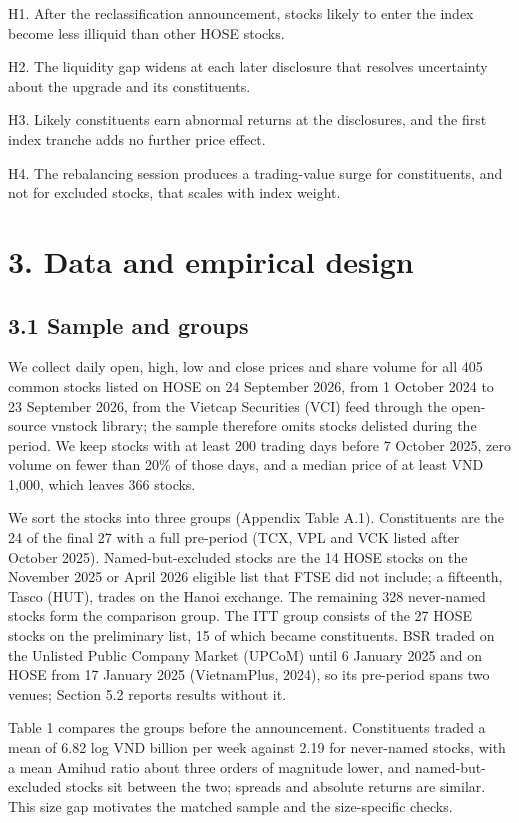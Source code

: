\documentclass[review,authoryear,12pt]{elsarticle}
\begin{document}
H1. After the reclassification announcement, stocks likely to enter the
index become less illiquid than other HOSE stocks.

H2. The liquidity gap widens at each later disclosure that resolves
uncertainty about the upgrade and its constituents.

H3. Likely constituents earn abnormal returns at the disclosures, and
the first index tranche adds no further price effect.

H4. The rebalancing session produces a trading-value surge for
constituents, and not for excluded stocks, that scales with index
weight.

\hypertarget{data-and-empirical-design}{%
\section*{3. Data and empirical design}}

\hypertarget{sample-and-groups}{%
\subsection*{3.1 Sample and groups}}

We collect daily open, high, low and close prices and share volume for
all 405 common stocks listed on HOSE on 24 September 2026, from 1
October 2024 to 23 September 2026, from the Vietcap Securities (VCI)
feed through the open-source vnstock library; the sample therefore omits
stocks delisted during the period. We keep stocks with at least 200
trading days before 7 October 2025, zero volume on fewer than 20\% of
those days, and a median price of at least VND 1,000, which leaves 366
stocks.

We sort the stocks into three groups (Appendix Table A.1). Constituents
are the 24 of the final 27 with a full pre-period (TCX, VPL and VCK
listed after October 2025). Named-but-excluded stocks are the 14 HOSE
stocks on the November 2025 or April 2026 eligible list that FTSE did
not include; a fifteenth, Tasco (HUT), trades on the Hanoi exchange. The
remaining 328 never-named stocks form the comparison group. The ITT
group consists of the 27 HOSE stocks on the preliminary list, 15 of
which became constituents. BSR traded on the Unlisted Public Company
Market (UPCoM) until 6 January 2025 and on HOSE from 17 January 2025
(VietnamPlus, 2024), so its pre-period spans two venues; Section 5.2
reports results without it.

Table 1 compares the groups before the announcement. Constituents traded
a mean of 6.82 log VND billion per week against 2.19 for never-named
stocks, with a mean Amihud ratio about three orders of magnitude lower,
and named-but-excluded stocks sit between the two; spreads and absolute
returns are similar. This size gap motivates the matched sample and the
size-specific checks.
\end{document}
